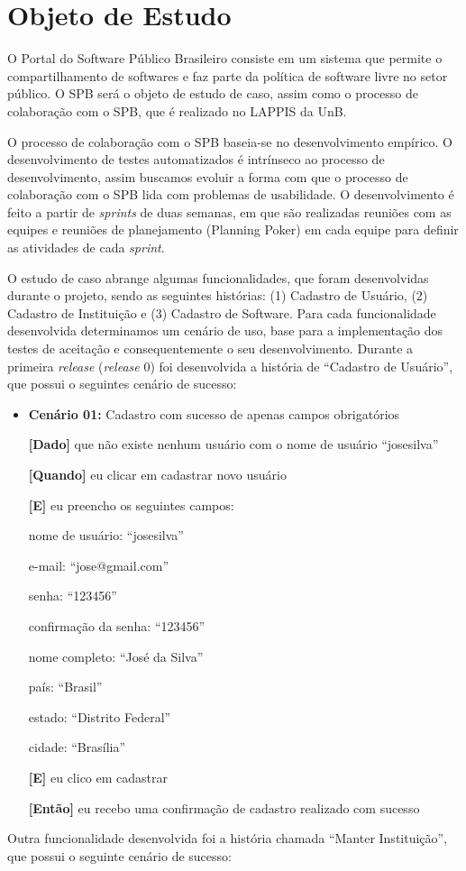 \section{Objeto de Estudo}

O Portal do Software Público Brasileiro consiste em um sistema que permite o compartilhamento de softwares e faz parte da política de software livre no setor público.
O SPB será o objeto de estudo de caso, assim como o processo de colaboração com o SPB, que é realizado no LAPPIS da UnB.

O processo de colaboração com o SPB baseia-se no desenvolvimento empírico. O desenvolvimento de testes automatizados é intrínseco ao processo de desenvolvimento, assim buscamos evoluir a forma com que o processo de colaboração com o SPB lida com problemas de usabilidade.
O desenvolvimento é feito a partir de \textit{sprints} de duas semanas, em que são realizadas reuniões com as equipes e reuniões de planejamento (Planning Poker) em cada equipe para definir as atividades de cada \textit{sprint}.

O estudo de caso abrange algumas funcionalidades, que foram desenvolvidas durante o projeto, sendo as seguintes histórias: (1) Cadastro de Usuário, (2) Cadastro de Instituição e (3) Cadastro de Software.
%
Para cada funcionalidade desenvolvida determinamos um cenário de uso, base para a implementação dos testes de aceitação e consequentemente o seu desenvolvimento.
%
Durante a primeira \textit{release} (\textit{release} 0) foi desenvolvida a história de ``Cadastro de Usuário'', que possui o seguintes cenário de sucesso:

	\begin{itemize}
	\item\textbf{Cenário 01:} Cadastro com sucesso de apenas campos obrigatórios

	\textbf{[Dado]} que não existe nenhum usuário com o nome de usuário ``josesilva''

	\textbf{[Quando]} eu clicar em cadastrar novo usuário

	\textbf{[E]} eu preencho os seguintes campos: 

  		\subitem nome de usuário: ``josesilva''

  		\subitem e-mail: ``jose@gmail.com''

  		\subitem senha: ``123456''

  		\subitem confirmação da senha: ``123456''

  		\subitem nome completo: ``José da Silva''

  		\subitem país: ``Brasil''

  		\subitem estado: ``Distrito Federal''

  		\subitem cidade: ``Brasília''

	\textbf{[E]} eu clico em cadastrar

	\textbf{[Então]} eu recebo uma confirmação de cadastro realizado com sucesso
	\end{itemize}
Outra funcionalidade desenvolvida foi a história chamada ``Manter Instituição'', que possui o seguinte cenário de sucesso:

